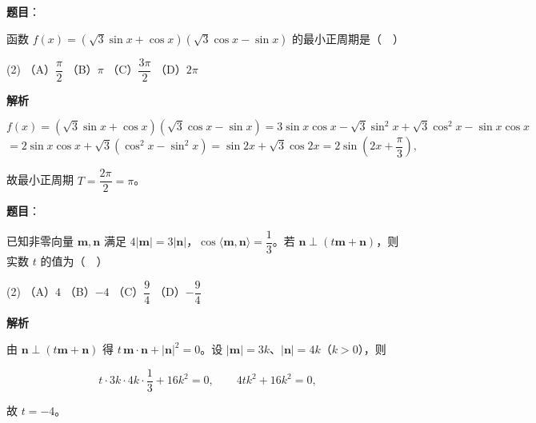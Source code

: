 \begin{answer}

\textbf{题目}：

函数 \(f(x)=(\sqrt{3}\sin x+\cos x)(\sqrt{3}\cos x-\sin x)\) 的最小正周期是（　）

\begin{gkopts}(2)
\task （A）\(\dfrac{\pi}{2}\)
\task （B）\(\pi\)
\task （C）\(\dfrac{3\pi}{2}\)
\task （D）\(2\pi\)
\end{gkopts}

\textbf{解析}

\nopagebreak[4]
\[
f(x)=(\sqrt{3}\sin x+\cos x)(\sqrt{3}\cos x-\sin x)=3\sin x\cos x-\sqrt{3}\sin^{2}x+\sqrt{3}\cos^{2}x-\sin x\cos x
\]
\nopagebreak[4]
\[
=2\sin x\cos x+\sqrt{3}(\cos^{2}x-\sin^{2}x)=\sin 2x+\sqrt{3}\cos 2x=2\sin\left(2x+\dfrac{\pi}{3}\right),
\]

故最小正周期 \(T=\dfrac{2\pi}{2}=\pi\)。


\end{answer}
\begin{answer}

\textbf{题目}：

已知非零向量 \(\mathbf{m},\mathbf{n}\) 满足 \(4|\mathbf{m}|=3|\mathbf{n}|\)，\(\cos\langle\mathbf{m},\mathbf{n}\rangle=\dfrac{1}{3}\)。若 \(\mathbf{n}\perp(t\mathbf{m}+\mathbf{n})\)，则实数 \(t\) 的值为（　）

\begin{gkopts}(2)
\task （A）\(4\)
\task （B）\(-4\)
\task （C）\(\dfrac{9}{4}\)
\task （D）\(-\dfrac{9}{4}\)
\end{gkopts}

\textbf{解析}

由 \(\mathbf{n}\perp(t\mathbf{m}+\mathbf{n})\) 得 \(t\,\mathbf{m}\cdot\mathbf{n}+|\mathbf{n}|^{2}=0\)。设 \(|\mathbf{m}|=3k\)、\(|\mathbf{n}|=4k\)（\(k>0\)），则

\nopagebreak[4]
\[
t\cdot 3k\cdot 4k\cdot\dfrac{1}{3}+16k^{2}=0,\qquad 4tk^{2}+16k^{2}=0,
\]

故 \(t=-4\)。


\end{answer}
